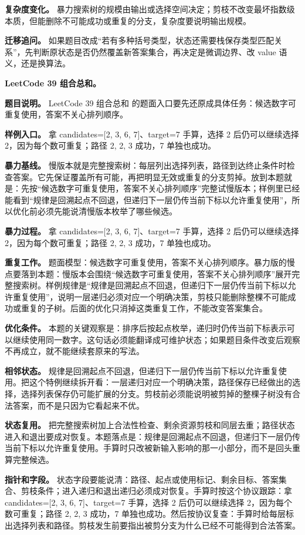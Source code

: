 \textbf{复杂度变化。} 暴力搜索树的规模由输出或选择空间决定；剪枝不改变最坏指数级本质，但能删除不可能成功或重复的分支，复杂度要说明输出规模。

\textbf{迁移追问。} 如果题目改成“若有多种括号类型，状态还需要栈保存类型匹配关系”，先判断原状态是否仍然覆盖新答案集合，再决定是微调边界、改 value 语义，还是换算法。

\noindent\textbf{LeetCode 39 组合总和。}

\textbf{题目说明。} LeetCode 39 组合总和 的题面入口要先还原成具体任务：候选数字可重复使用，答案不关心排列顺序。

\textbf{样例入口。} 拿 candidates=[2, 3, 6, 7]、target=7 手算，选择 2 后仍可以继续选择 2，因为每个数可重复；路径 2, 2, 3 成功，7 单独也成功。

\textbf{暴力基线。} 慢版本就是完整搜索树：每层列出选择列表，路径到达终止条件时检查答案。它先保证覆盖所有可能，再把明显无效或重复的分支剪掉。放到本题就是：先按“候选数字可重复使用，答案不关心排列顺序”完整试慢版本；样例里已经能看到“规律是回溯起点不回退，但递归下一层仍传当前下标以允许重复使用”，所以优化前必须先能说清慢版本枚举了哪些候选。

\textbf{暴力过程。} 拿 candidates=[2, 3, 6, 7]、target=7 手算，选择 2 后仍可以继续选择 2，因为每个数可重复；路径 2, 2, 3 成功，7 单独也成功。

\textbf{重复工作。} 题面模型：候选数字可重复使用，答案不关心排列顺序。暴力版的慢点要落到本题：慢版本会围绕“候选数字可重复使用，答案不关心排列顺序”展开完整搜索树。样例规律是“规律是回溯起点不回退，但递归下一层仍传当前下标以允许重复使用”，说明一层递归必须对应一个明确决策，剪枝只能删除整棵不可能成功或重复的子树。后面的优化只消掉这类重复工作，不能改变答案集合。

\textbf{优化条件。} 本题的关键观察是：排序后按起点枚举，递归时仍传当前下标表示可以继续使用同一数字。这句话必须能翻译成可维护状态；如果题目条件改变后观察不再成立，就不能继续套原来的写法。

\textbf{相邻状态。} 规律是回溯起点不回退，但递归下一层仍传当前下标以允许重复使用。把这个特例继续拆开看：一层递归对应一个明确决策，路径保存已经做出的选择，选择列表保存仍可能扩展的分支。剪枝前必须能说明被剪掉的整棵子树没有合法答案，而不是只因为它看起来不优。

\textbf{状态复用。} 把完整搜索树加上合法性检查、剩余资源剪枝和同层去重；路径状态进入和退出要成对恢复。本题落点是：规律是回溯起点不回退，但递归下一层仍传当前下标以允许重复使用。手算时只改被新输入影响的那一小部分，而不是回头重算完整候选。

\textbf{指针和字段。} 状态字段要能说清：路径、起点或使用标记、剩余目标、答案集合、剪枝条件；进入递归和退出递归必须成对恢复。手算时按这个协议跟踪：拿 candidates=[2, 3, 6, 7]、target=7 手算，选择 2 后仍可以继续选择 2，因为每个数可重复；路径 2, 2, 3 成功，7 单独也成功。然后按协议复查：手算时给每层标出选择列表和路径。剪枝发生前要指出被剪分支为什么已经不可能得到合法答案。

